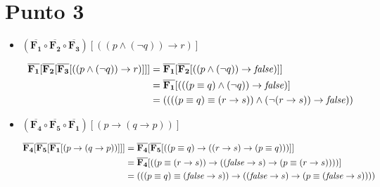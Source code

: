 \documentclass{article}
\newcommand{\val}[2]{\mathbf{#1}[#2]}
\newlength{\logicv}
\newenvironment{logicenv}[2][0]{
  \begin{tcolorbox}[demo, title = #2]
  \vspace*{#1\logicv}
}{
  \end{tcolorbox}
}
\begin{document}
\section{Punto 3}

\begin{itemize}
    \item $\val{(\overline{F_1} \circ \overline{F_2} \circ \overline{F_3})}{((p \land (\neg q)) \to r)}$
    \begin{logicenv}{punto 3}
        \begin{alignat*}{2}
            \val{\overline{F_1}}{\val{\overline{F_2}}{\val{\overline{F_3}}{((p \land (\neg q)) \to r)}}} &= \val{\overline{F_1}}{\val{\overline{F_2}}{((p \land (\neg q)) \to \textrm{\textit{false}})}}\\
            &= \val{\overline{F_1}}{(((p \equiv q) \land (\neg q)) \to \textrm{\textit{false}})}\\
            &= ((((p \equiv q) \equiv (r \to s)) \land (\neg (r \to s)) \to \textrm{\textit{false}}))
        \end{alignat*}
    \end{logicenv}

    \item $\val{(\overline{F_4} \circ \overline{F_5} \circ \overline{F_1})}{(p \to (q \to p))}$
    \begin{logicenv}{punto 3}
        \begin{alignat*}{2}
            \val{\overline{F_4}}{\val{\overline{F_5}}{\val{\overline{F_1}}{(p \to (q \to p))}}} &= \val{\overline{F_4}}{\val{\overline{F_5}}{((p \equiv q) \to ((r \to s) \to (p \equiv q)))}}\\
            &= \val{\overline{F_4}}{((p \equiv (r \to s)) \to ((\textrm{\textit{false}} \to s) \to (p \equiv (r \to s))))}\\
            &= (((p \equiv q) \equiv (\textrm{\textit{false}} \to s)) \to ((\textrm{\textit{false}} \to s) \to (p \equiv (\textrm{\textit{false}} \to s))))
        \end{alignat*}
    \end{logicenv}


\end{itemize}
\end{document}
